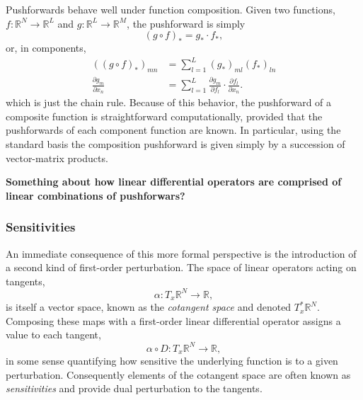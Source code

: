 Pushforwards behave well under function composition.  Given two functions,
$f : \mathbb{R}^{N} \rightarrow \mathbb{R}^{L}$ and
$g : \mathbb{R}^{L} \rightarrow \mathbb{R}^{M}$, the pushforward is simply
%
\begin{equation*}
\left( g \circ f \right)_{*} = g_{*} \cdot f_{*},
\end{equation*}
%
or, in components,
%
\begin{align*}
\left( \left( g \circ f \right)_{*} \right)_{mn} &= 
\sum_{l = 1}^{L} \left( g_{*} \right)_{ml} \left( f_{*} \right)_{ln}
\\
\frac{ \partial g_{m} }{ \partial x_{n} } &= 
\sum_{l = 1}^{L} \frac{ \partial g_{m} }{ \partial f_{l} } \cdot \frac{ \partial f_{l} }{ \partial x_{n} }.
\end{align*}
%
which is just the chain rule.  Because of this behavior, the pushforward of a
composite function is straightforward computationally, provided that the pushforwards
of each component function are known.  In particular, using the standard basis the
composition pushforward is given simply by a succession of vector-matrix products.

\textbf{Something about how linear differential operators are comprised of linear
combinations of pushforwars?}

\subsubsection{Sensitivities}

An immediate consequence of this more formal perspective is the introduction of a second
kind of first-order perturbation.  The space of linear operators acting on tangents,
%
\begin{equation*}
\alpha : T_{x} \mathbb{R}^{N} \rightarrow \mathbb{R},
\end{equation*}
%
is itself a vector space, known as the \textit{cotangent space} and denoted 
$T^{*}_{x} \mathbb{R}^{N}$.  Composing these maps with a first-order linear differential 
operator assigns a value to each tangent,
%
\begin{equation*}
\alpha \circ D : T_{x} \mathbb{R}^{N} \rightarrow \mathbb{R},
\end{equation*}
%
in some sense quantifying how sensitive the underlying function is to a given 
perturbation.  Consequently elements of the cotangent space are often known as
\textit{sensitivities} and provide dual perturbation to the tangents.

